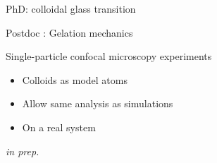 \begin{frame}{PhD: colloidal glass transition}
\medskip
{}
%

\end{frame}


\begin{frame}{Postdoc : Gelation mechanics}
\begin{block}{Single-particle confocal microscopy experiments}
\begin{itemize}
\item Colloids as model atoms
\item Allow same analysis as simulations
\item On a real system
\end{itemize}
\end{block}


\bigskip
{}\hfill\textit{\scriptsize in prep.}

\medskip
{}

\end{frame}
